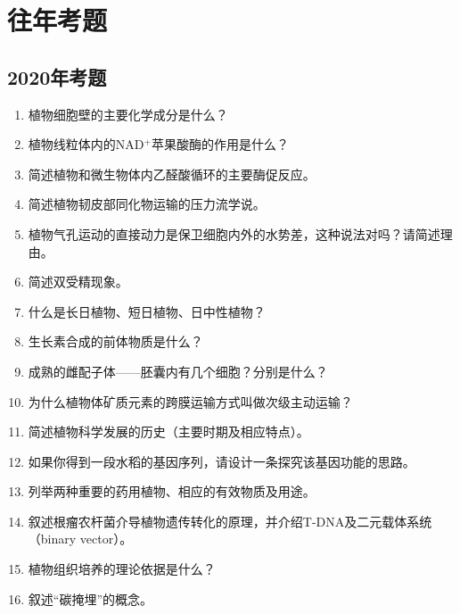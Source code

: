 \chapter{往年考题}

\section{2020年考题}

\begin{enumerate}
    \item 植物细胞壁的主要化学成分是什么？
    \item 植物线粒体内的NAD$^+$苹果酸酶的作用是什么？
    \item 简述植物和微生物体内乙醛酸循环的主要酶促反应。
    \item 简述植物韧皮部同化物运输的压力流学说。
    \item 植物气孔运动的直接动力是保卫细胞内外的水势差，这种说法对吗？请简述理由。
    \item 简述双受精现象。
    \item 什么是长日植物、短日植物、日中性植物？
    \item 生长素合成的前体物质是什么？
    \item 成熟的雌配子体——胚囊内有几个细胞？分别是什么？
    \item 为什么植物体矿质元素的跨膜运输方式叫做次级主动运输？
    \item 简述植物科学发展的历史（主要时期及相应特点）。
    \item 如果你得到一段水稻的基因序列，请设计一条探究该基因功能的思路。
    \item 列举两种重要的药用植物、相应的有效物质及用途。
    \item 叙述根瘤农杆菌介导植物遗传转化的原理，并介绍T-DNA及二元载体系统（binary vector）。
    \item 植物组织培养的理论依据是什么？
    \item 叙述“碳掩埋”的概念。
\end{enumerate}
